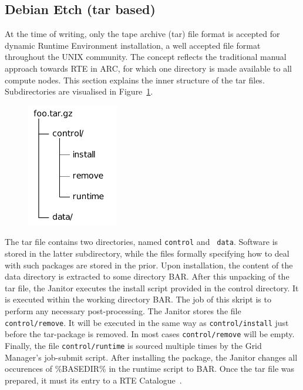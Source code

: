 \subsection{Debian Etch (tar based)}

At the time of writing, only the tape archive (tar) file format is
accepted for dynamic Runtime Environment installation, a well accepted
file format throughout the UNIX community. The concept reflects the
traditional manual approach towards RTE in ARC, for which one directory
is made available to all compute nodes. This section explains the
inner structure of the tar files.  Subdirectories are visualised in
Figure~\ref{fig:tar_folder}.

\begin{figure}
  \begin{center}
    \includegraphics[width=4cm]{images/tar_folder.pdf}
    \label{fig:tar_folder}
  \end{center}
\end{figure}

The tar file contains two directories, named {\tt control} and {\tt
data}. Software is stored in the latter subdirectory, while the files
formally specifying how to deal with such packages are stored in the
prior. Upon installation, the content of the data directory is extracted
to some directory \textdollar BAR.  After this unpacking of the tar file,
the Janitor executes the install script provided in the control directory.
It is executed within the working directory \textdollar BAR. The job of
this skript is to perform any necessary post-processing.  The Janitor
stores the file \texttt{control/remove}. It will be executed in the
same way as \texttt{control/install} just before the tar-package is
removed. In most cases \texttt{control/remove} will be empty.  Finally,
the file \texttt{control/runtime} is sourced multiple times by the
Grid Manager's job-submit script. After installing the package, the
Janitor changes all occurences of \%BASEDIR\% in the runtime script to
\textdollar BAR.  Once the tar file was prepared, it must its entry to
a RTE Catalogue~\cite[p. 10]{BAYER_2007}.

